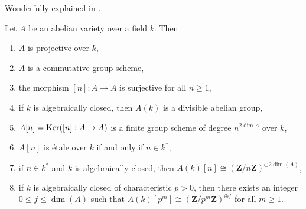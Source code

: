 \begin{proposition}
\label{proposition-review-abelian-varieties}
\begin{reference}
Wonderfully explained in \cite{AVar}.
\end{reference}
Let $A$ be an abelian variety over a field $k$. Then
\begin{enumerate}
\item $A$ is projective over $k$,
\item $A$ is a commutative group scheme,
\item the morphism $[n] : A \to A$ is surjective for all $n \geq 1$,
\item if $k$ is algebraically closed, then $A(k)$ is a divisible abelian group,
\item $A[n] = \mathop{\mathrm{Ker}}([n] : A \to A)$ is a finite group scheme of degree
$n^{2\dim A}$ over $k$,
\item $A[n]$ is \'etale over $k$ if and only if $n \in k^*$,
\item if $n \in k^*$ and $k$ is algebraically closed,
then $A(k)[n] \cong (\mathbf{Z}/n\mathbf{Z})^{\oplus 2\dim(A)}$,
\item if $k$ is algebraically closed of characteristic $p > 0$, then
there exists an integer $0 \leq f \leq \dim(A)$ such that
$A(k)[p^m] \cong (\mathbf{Z}/p^m\mathbf{Z})^{\oplus f}$
for all $m \geq 1$.
\end{enumerate}
\end{proposition}

